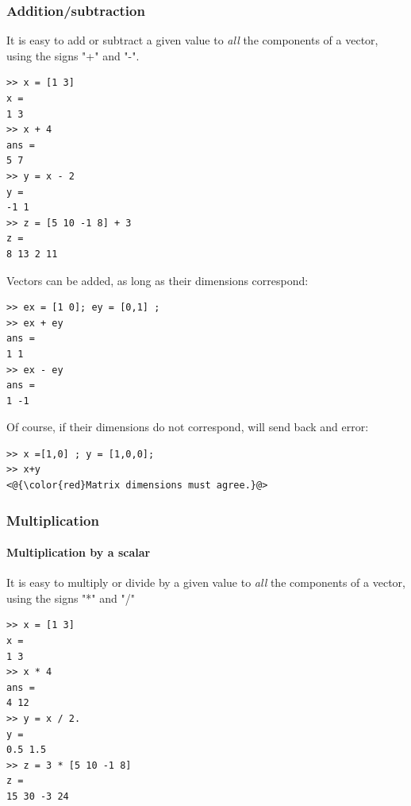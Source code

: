 		\subsubsection{Addition/subtraction}
			It is easy to add or subtract a given value to \emph{all} the components of a vector, using the signs "+" and "-".
\begin{lstlisting}
>> x = [1 3]
x = 
1 3
>> x + 4
ans =
5 7
>> y = x - 2
y =
-1 1
>> z = [5 10 -1 8] + 3
z = 
8 13 2 11
\end{lstlisting}
			Vectors can be added, as long as their dimensions correspond:
\begin{lstlisting}
>> ex = [1 0]; ey = [0,1] ;
>> ex + ey
ans =
1 1
>> ex - ey
ans =
1 -1
\end{lstlisting}
			Of course, if their dimensions do not correspond, \matlab will send back and error:
\begin{lstlisting}
>> x =[1,0] ; y = [1,0,0];
>> x+y
<@{\color{red}Matrix dimensions must agree.}@>
\end{lstlisting}

		\subsubsection{Multiplication}
			\paragraph{Multiplication by a scalar}
				It is easy to multiply or divide by a given value to \emph{all} the components of a vector, using the signs "*" and "/"
\begin{lstlisting}
>> x = [1 3]
x = 
1 3
>> x * 4
ans =
4 12
>> y = x / 2.
y =
0.5 1.5
>> z = 3 * [5 10 -1 8]
z = 
15 30 -3 24
\end{lstlisting}

